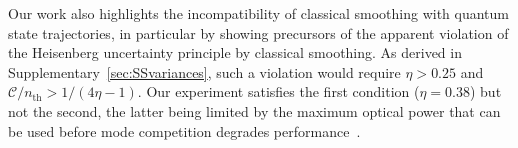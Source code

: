 \documentclass[aps,prx,twocolumn,amsmath,amssymb,superscriptaddress,floatfix,longbibliography
]{revtex4-2}
\begin{document}
Our work also highlights the incompatibility of classical smoothing with quantum state trajectories, in particular by showing precursors of the apparent violation of the Heisenberg uncertainty principle by classical smoothing. As derived in Supplementary~\ref{sec:SSvariances}, such a violation would require $\eta>0.25$ and $\mathcal{C}/n_\text{th} > 1/(4\eta-1)$. Our experiment satisfies the first condition ($\eta=0.38$) but not the second, the latter being limited by the maximum optical power that can be used before mode competition degrades performance~\cite{khademi2024optomechanical}.

\end{document}
